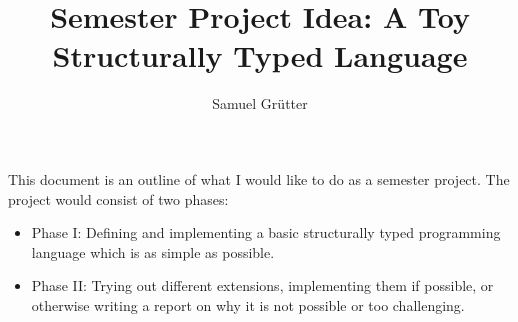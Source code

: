 \documentclass[12pt, draft]{article}
\title{Semester Project Idea: A Toy Structurally Typed Language}
\author{Samuel Gr\"utter}
\date{}
\begin{document}


\maketitle
\parindent=0pt

This document is an outline of what I would like to do as a semester project. 
The project would consist of two phases:
\begin{itemize}
\item Phase I: Defining and implementing a basic structurally typed programming language which is as simple as possible.
\item Phase II: Trying out different extensions, implementing them if possible, or otherwise writing a report on why it is not possible or too challenging.
\end{itemize}


\end{document}

